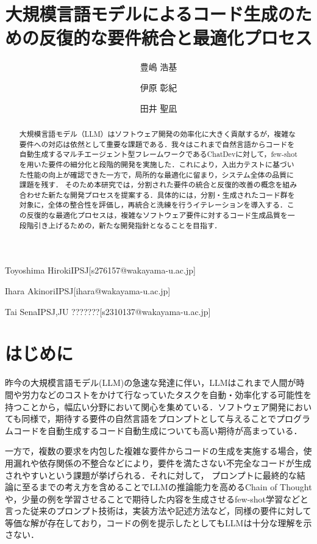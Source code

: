 \documentclass[submit,techrep,noauthor]{ipsj}
\begin{document}
\title{大規模言語モデルによるコード生成のための反復的な要件統合と最適化プロセス\\}




\author{豊嶋 浩基}{Toyoshima Hiroki}{IPSJ}[s276157@wakayama-u.ac.jp]
\author{伊原 彰紀}{Ihara Akinori}{IPSJ}[ihara@wakayama-u.ac.jp]
\author{田井 聖凪}{Tai Sena}{IPSJ,JU ???????}[s2310137@wakayama-u.ac.jp]

\begin{abstract}
大規模言語モデル（LLM）はソフトウェア開発の効率化に大きく貢献するが，複雑な要件への対応は依然として重要な課題である．我々はこれまで自然言語からコードを自動生成するマルチエージェント型フレームワークであるChatDevに対して，few-shotを用いた要件の細分化と段階的開発を実施した．これにより，入出力テストに基づいた性能の向上が確認できた一方で，局所的な最適化に留まり，システム全体の品質に課題を残す．
そのため本研究では，分割された要件の統合と反復的改善の概念を組み合わせた新たな開発プロセスを提案する．具体的には，分割・生成されたコード群を対象に，全体の整合性を評価し，再統合と洗練を行うイテレーションを導入する．この反復的な最適化プロセスは，複雑なソフトウェア要件に対するコード生成品質を一段階引き上げるための，新たな開発指針となることを目指す．

\end{abstract}


\maketitle

\section{はじめに}
昨今の大規模言語モデル(LLM)の急速な発達に伴い，LLMはこれまで人間が時間や労力などのコストをかけて行なっていたタスクを自動・効率化する可能性を持つことから，幅広い分野において関心を集めている．ソフトウェア開発においても同様で，期待する要件の自然言語をプロンプトとして与えることでプログラムコードを自動生成するコード自動生成についても高い期待が高まっている．
 
一方で，複数の要求を内包した複雑な要件からコードの生成を実施する場合，使用漏れや依存関係の不整合などにより，要件を満たさない不完全なコードが生成されやすいという課題が挙げられる．それに対して， プロンプトに最終的な結論に至るまでの考え方を含めることでLLMの推論能力を高めるChain of Thoughtや，少量の例を学習させることで期待した内容を生成させるfew-shot学習などと言った従来のプロンプト技術は，実装方法や記述方法など，同様の要件に対して等価な解が存在しており，コードの例を提示したとしてもLLMは十分な理解を示さない．
\end{document}
